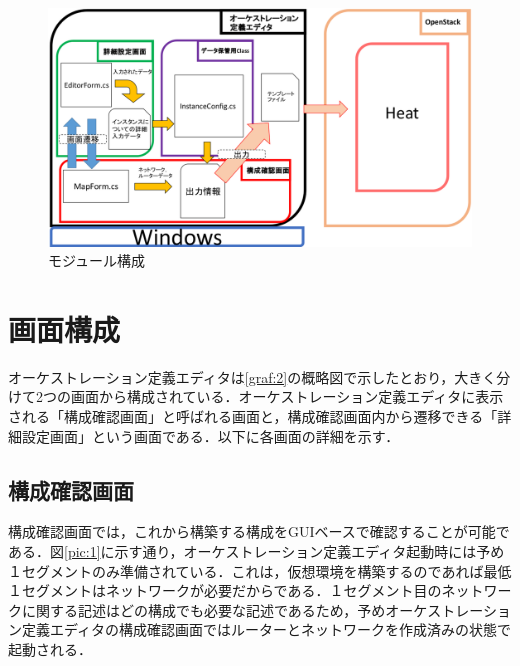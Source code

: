 \documentclass[mingoth]{kut-paper}		%
\begin{document}
	\begin{figure}[H]
		\begin{center}
			\includegraphics[scale=0.42]{Document/モジュール構成図.eps}
			\caption{モジュール構成}
			\label{graf:module}
		\end{center}
	\end{figure}
	
	\section{画面構成}
	オーケストレーション定義エディタは\ref{graf:2}の概略図で示したとおり，大きく分けて2つの画面から構成されている．オーケストレーション定義エディタに表示される「構成確認画面」と呼ばれる画面と，構成確認画面内から遷移できる「詳細設定画面」という画面である．以下に各画面の詳細を示す．
	\newpage
		\subsection{構成確認画面}
		構成確認画面では，これから構築する構成をGUIベースで確認することが可能である．図\ref{pic:1}に示す通り，オーケストレーション定義エディタ起動時には予め１セグメントのみ準備されている．これは，仮想環境を構築するのであれば最低１セグメントはネットワークが必要だからである．１セグメント目のネットワークに関する記述はどの構成でも必要な記述であるため，予めオーケストレーション定義エディタの構成確認画面ではルーターとネットワークを作成済みの状態で起動される．
		
\end{document}
